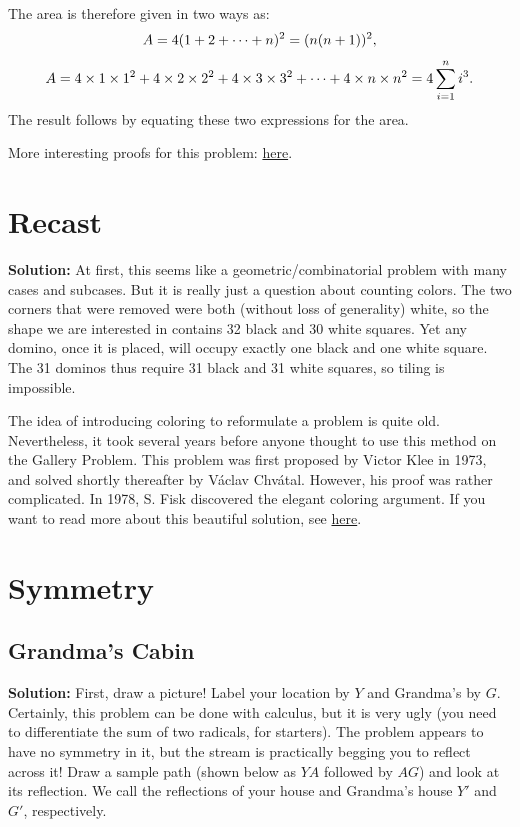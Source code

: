 \documentclass[12pt]{article}
\begin{document}
The area is therefore given in two ways as:
\begin{equation}
    A=4(1+2+\dots+n)^2=(n(n+1))^2, \notag
\end{equation}
\begin{equation}
    A=4\times 1 \times 1^2 + 4 \times 2 \times 2^2 + 4 \times 3 \times 3^2 + \dots + 4 \times n \times n^2 = 4\sum_{i=1}^n i^3. \notag
\end{equation}
The result follows by equating these two expressions for the area.

More interesting proofs for this problem: \href{https://proofwiki.org/wiki/Sum_of_Sequence_of_Cubes}{here}.

\section{Recast}

\textbf{Solution:} At first, this seems like a geometric/combinatorial problem with many cases and subcases. But it is really just a question about counting colors. The two corners that were removed were
both (without loss of generality) white, so the shape we are interested in contains 32 black and 30 white
squares. Yet any domino, once it is placed, will occupy exactly one black and one white square. The
31 dominos thus require 31 black and 31 white squares, so tiling is impossible.

The idea of introducing coloring to reformulate a problem is quite old. Nevertheless, it took several
years before anyone thought to use this method on the Gallery Problem.
This problem was first proposed by Victor Klee in 1973, and solved shortly thereafter by Václav
Chvátal. However, his proof was rather complicated. In 1978, S. Fisk discovered the elegant coloring
argument. If you want to read more about this beautiful solution, see \href{https://en.wikipedia.org/wiki/Art_gallery_problem}{here}.

\section{Symmetry}

\subsection{Grandma's Cabin}

\textbf{Solution:} First, draw a picture! Label your location by $Y$ and Grandma's by $G$. Certainly, this
problem can be done with calculus, but it is very ugly (you need to diﬀerentiate the sum of two radicals,
for starters). The problem appears to have no symmetry in it, but the stream is practically begging you
to reflect across it! Draw a sample path (shown below as $YA$ followed by $AG$) and look at its reflection.
We call the reflections of your house and Grandma's house $Y'$ and $G'$, respectively.
\end{document}
